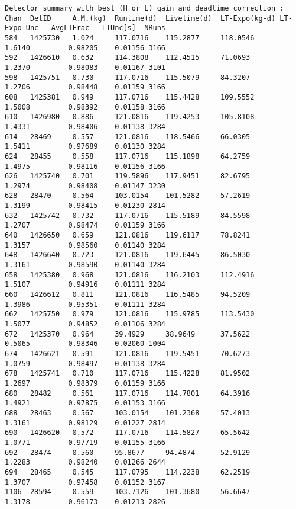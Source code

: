 \documentclass[notitlepage,rmp,aps,10pt]{revtex4-1}
\begin{document}
\begin{verbatim}
Detector summary with best (H or L) gain and deadtime correction :
Chan  DetID     A.M.(kg)  Runtime(d)  Livetime(d)  LT-Expo(kg-d) LT-Expo-Unc   AvgLTFrac   LTUnc[s]  NRuns
584   1425730   1.024     117.0716    115.2877     118.0546       1.6140         0.98205    0.01156 3166
592   1426610   0.632     114.3808    112.4515     71.0693        1.2370         0.98083    0.01167 3101
598   1425751   0.730     117.0716    115.5079     84.3207        1.2706         0.98448    0.01159 3166
608   1425381   0.949     117.0716    115.4428     109.5552       1.5008         0.98392    0.01158 3166
610   1426980   0.886     121.0816    119.4253     105.8108       1.4331         0.98406    0.01138 3284
614   28469     0.557     121.0816    118.5466     66.0305        1.5411         0.97689    0.01130 3284
624   28455     0.558     117.0716    115.1898     64.2759        1.4975         0.98116    0.01156 3166
626   1425740   0.701     119.5896    117.9451     82.6795        1.2974         0.98408    0.01147 3230
628   28470     0.564     103.0154    101.5282     57.2619        1.3199         0.98415    0.01230 2814
632   1425742   0.732     117.0716    115.5189     84.5598        1.2707         0.98474    0.01159 3166
640   1426650   0.659     121.0816    119.6117     78.8241        1.3157         0.98560    0.01140 3284
648   1426640   0.723     121.0816    119.6445     86.5030        1.3161         0.98590    0.01140 3284
658   1425380   0.968     121.0816    116.2103     112.4916       1.5107         0.94916    0.01111 3284
660   1426612   0.811     121.0816    116.5485     94.5209        1.3986         0.95351    0.01111 3284
662   1425750   0.979     121.0816    115.9785     113.5430       1.5077         0.94852    0.01106 3284
672   1425370   0.964     39.4929     38.9649      37.5622        0.5065         0.98346    0.02060 1004
674   1426621   0.591     121.0816    119.5451     70.6273        1.0759         0.98497    0.01138 3284
678   1425741   0.710     117.0716    115.4228     81.9502        1.2697         0.98379    0.01159 3166
680   28482     0.561     117.0716    114.7801     64.3916        1.4921         0.97875    0.01153 3166
688   28463     0.567     103.0154    101.2368     57.4013        1.3161         0.98129    0.01227 2814
690   1426620   0.572     117.0716    114.5827     65.5642        1.0771         0.97719    0.01155 3166
692   28474     0.560     95.8677     94.4874      52.9129        1.2283         0.98240    0.01266 2644
694   28465     0.545     117.0795    114.2238     62.2519        1.3707         0.97458    0.01152 3167
1106  28594     0.559     103.7126    101.3680     56.6647        1.3178         0.96173    0.01213 2826

\end{verbatim}
\end{document}
